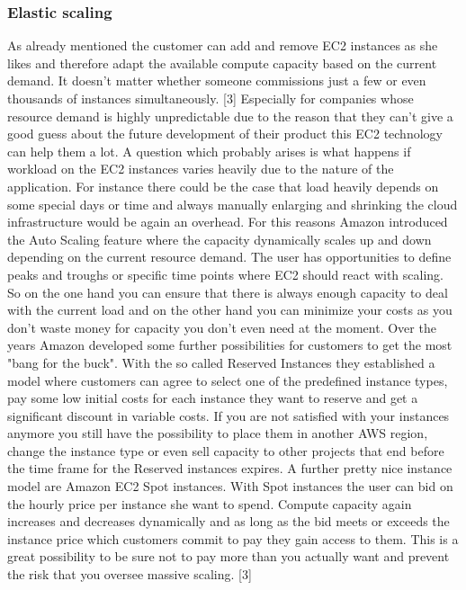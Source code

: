 \subsubsection{Elastic scaling}
As already mentioned the customer can add and remove EC2 instances as she likes and therefore adapt the available compute capacity based on the current demand. It doesn't matter whether someone commissions just a few or even thousands of instances simultaneously. [3] Especially for companies whose resource demand is highly unpredictable due to the reason that they can't give a good guess about the future development of their product this EC2 technology can help them a lot. A question which probably arises is what happens if workload on the EC2 instances varies heavily due to the nature of the application. For instance there could be the case that load heavily depends on some special days or time and always manually enlarging and shrinking the cloud infrastructure would be again an overhead. For this reasons Amazon introduced the Auto Scaling feature where the capacity dynamically scales up and down depending on the current resource demand. The user has opportunities to define peaks and troughs or specific time points where EC2 should react with scaling. So on the one hand you can ensure that there is always enough capacity to deal with the current load and on the other hand you can minimize your costs as you don't waste money for capacity you don't even need at the moment. Over the years Amazon developed some further possibilities for customers to get the most "bang for the buck". With the so called Reserved Instances they established a model where customers can agree to select one of the predefined instance types, pay some low initial costs for each instance they want to reserve and get a significant discount in variable costs. If you are not satisfied with your instances anymore you still have the possibility to place them in another AWS region, change the instance type or even sell capacity to other projects that end before the time frame for the Reserved instances expires. A further pretty nice instance model are Amazon EC2 Spot instances. With Spot instances the user can bid on the hourly price per instance she want to spend. Compute capacity again increases and decreases dynamically and as long as the bid meets or exceeds the instance price which customers commit to pay they gain access to them. This is a great possibility to be sure not to pay more than you actually want and prevent the risk that you oversee massive scaling. [3]

